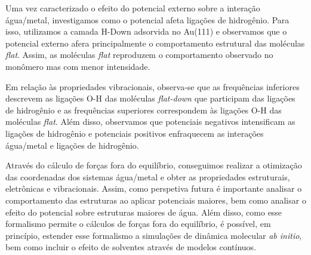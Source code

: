 Uma vez caracterizado o efeito do potencial externo sobre a interação água/metal, investigamos como o potencial afeta ligações de hidrogênio. Para isso, utilizamos a camada H-Down adsorvida no Au(111) e observamos que o potencial externo afera principalmente o comportamento estrutural das moléculas \textit{flat}. Assim, as moléculas \textit{flat} reproduzem o comportamento observado no monômero mas com menor intensidade.


Em relação às propriedades vibracionais, observa-se que as frequências inferiores descrevem as ligações O-H das moléculas \textit{flat-down} que participam das ligações de hidrogênio e as frequências superiores correspondem às ligações O-H das moléculas \textit{flat}. Além disso, observamos que potenciais negativos intensificam as ligações de hidrogênio e potenciais positivos enfraquecem as interações água/metal e ligações de hidrogênio.

Através do cálculo de forças fora do equilíbrio, conseguimos realizar a otimização das coordenadas dos sistemas água/metal e obter as propriedades estruturais, eletrônicas e vibracionais. Assim, como perspetiva futura é importante analisar o comportamento das estruturas ao aplicar potenciais maiores, bem como analisar o efeito do potencial sobre estruturas maiores de água. Além disso, como esse formalismo permite o cálculos de forças fora do equilíbrio, é possível, em princípio, estender esse formalismo a simulações de dinâmica molecular \textit{ab initio}, bem como incluir o efeito de solventes através de modelos contínuos.